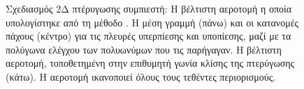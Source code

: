 \begin{figure}[h!]
\begin{minipage}[b]{1\linewidth}
 \centering
\end{minipage}
\caption{Σχεδιασμός 2Δ πτέρυγωσης συμπιεστή: Η βέλτιστη αεροτομή η οποία υπολογίστηκε από τη μέθοδο . Η μέση γραμμή (πάνω) και οι κατανομές πάχους (κέντρο) για τις πλευρές υπερπίεσης και υποπίεσης, μαζί με τα πολύγωνα ελέγχου των πολυωνύμων  που τις παρήγαγαν. Η βέλτιστη αεροτομή, τοποθετημένη στην επιθυμητή γωνία κλίσης της πτερύγωσης (κάτω). Η αεροτομή ικανοποιεί όλους τους τεθέντες περιορισμούς.} 
\label{CBRDrelaRes}
\end{figure}



%
